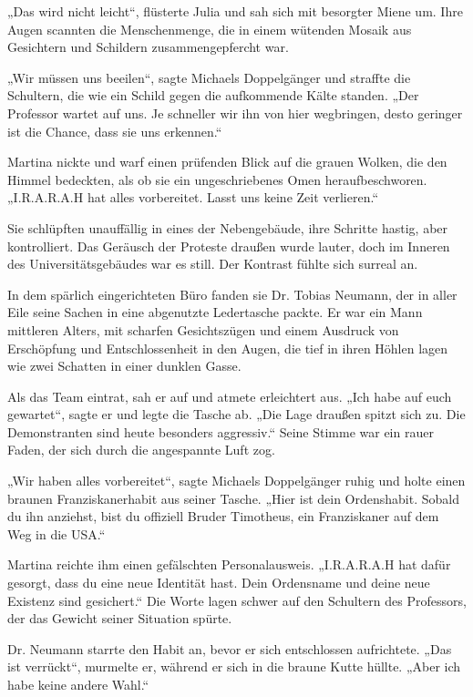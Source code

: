 \documentclass[
]{article}
\begin{document}
„Das wird nicht leicht``, flüsterte Julia und sah sich mit besorgter Miene um. Ihre Augen scannten die Menschenmenge, die in einem wütenden Mosaik aus Gesichtern und Schildern zusammengepfercht war.

„Wir müssen uns beeilen``, sagte Michaels Doppelgänger und straffte die Schultern, die wie ein Schild gegen die aufkommende Kälte standen. „Der Professor wartet auf uns. Je schneller wir ihn von hier wegbringen, desto geringer ist die Chance, dass sie uns erkennen.``

Martina nickte und warf einen prüfenden Blick auf die grauen Wolken, die den Himmel bedeckten, als ob sie ein ungeschriebenes Omen heraufbeschworen. „I.R.A.R.A.H hat alles vorbereitet. Lasst uns keine Zeit verlieren.``

Sie schlüpften unauffällig in eines der Nebengebäude, ihre Schritte hastig, aber kontrolliert. Das Geräusch der Proteste draußen wurde lauter, doch im Inneren des Universitätsgebäudes war es still. Der Kontrast fühlte sich surreal an.

In dem spärlich eingerichteten Büro fanden sie Dr. Tobias Neumann, der in aller Eile seine Sachen in eine abgenutzte Ledertasche packte. Er war ein Mann mittleren Alters, mit scharfen Gesichtszügen und einem Ausdruck von Erschöpfung und Entschlossenheit in den Augen, die tief in ihren Höhlen lagen wie zwei Schatten in einer dunklen Gasse.

Als das Team eintrat, sah er auf und atmete erleichtert aus. „Ich habe auf euch gewartet``, sagte er und legte die Tasche ab. „Die Lage draußen spitzt sich zu. Die Demonstranten sind heute besonders aggressiv.`` Seine Stimme war ein rauer Faden, der sich durch die angespannte Luft zog.

„Wir haben alles vorbereitet``, sagte Michaels Doppelgänger ruhig und holte einen braunen Franziskanerhabit aus seiner Tasche. „Hier ist dein Ordenshabit. Sobald du ihn anziehst, bist du offiziell Bruder Timotheus, ein Franziskaner auf dem Weg in die USA.``

Martina reichte ihm einen gefälschten Personalausweis. „I.R.A.R.A.H hat dafür gesorgt, dass du eine neue Identität hast. Dein Ordensname und deine neue Existenz sind gesichert.`` Die Worte lagen schwer auf den Schultern des Professors, der das Gewicht seiner Situation spürte.

Dr. Neumann starrte den Habit an, bevor er sich entschlossen aufrichtete. „Das ist verrückt``, murmelte er, während er sich in die braune Kutte hüllte. „Aber ich habe keine andere Wahl.``
\end{document}
